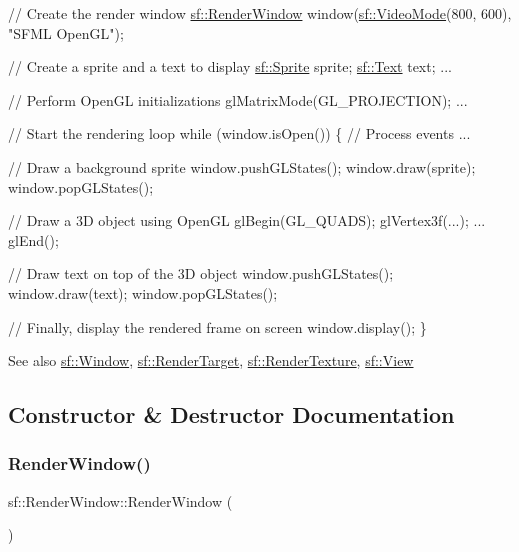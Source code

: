 \begin{DoxyCode}
\textcolor{comment}{// Create the render window}
\hyperlink{classsf_1_1_render_window}{sf::RenderWindow} window(\hyperlink{classsf_1_1_video_mode}{sf::VideoMode}(800, 600), \textcolor{stringliteral}{"SFML OpenGL"});

\textcolor{comment}{// Create a sprite and a text to display}
\hyperlink{classsf_1_1_sprite}{sf::Sprite} sprite;
\hyperlink{classsf_1_1_text}{sf::Text} text;
...

\textcolor{comment}{// Perform OpenGL initializations}
glMatrixMode(GL\_PROJECTION);
...

\textcolor{comment}{// Start the rendering loop}
while (window.isOpen())
\{
    \textcolor{comment}{// Process events}
    ...

    \textcolor{comment}{// Draw a background sprite}
    window.pushGLStates();
    window.draw(sprite);
    window.popGLStates();

    \textcolor{comment}{// Draw a 3D object using OpenGL}
    glBegin(GL\_QUADS);
        glVertex3f(...);
        ...
    glEnd();

    \textcolor{comment}{// Draw text on top of the 3D object}
    window.pushGLStates();
    window.draw(text);
    window.popGLStates();

    \textcolor{comment}{// Finally, display the rendered frame on screen}
    window.display();
\}
\end{DoxyCode}


\begin{DoxySeeAlso}{See also}
\hyperlink{classsf_1_1_window}{sf\+::\+Window}, \hyperlink{classsf_1_1_render_target}{sf\+::\+Render\+Target}, \hyperlink{classsf_1_1_render_texture}{sf\+::\+Render\+Texture}, \hyperlink{classsf_1_1_view}{sf\+::\+View} 
\end{DoxySeeAlso}


\subsection{Constructor \& Destructor Documentation}
\mbox{\label{classsf_1_1_render_window_a839bbf336bdcafb084dafc3076fc9021}} 
\subsubsection{\texorpdfstring{Render\+Window()}{RenderWindow()}\hspace{0.1cm}{\footnotesize\ttfamily [1/3]}}
{\footnotesize\ttfamily sf\+::\+Render\+Window\+::\+Render\+Window (\begin{DoxyParamCaption}{ }\end{DoxyParamCaption})}



